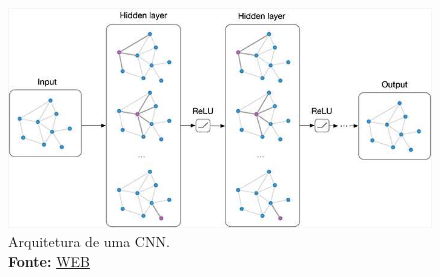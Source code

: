 \begin{figure}[h]
    \centering
    \includegraphics[width=0.5\linewidth]{image.png}
    \caption{Arquitetura de uma CNN. \\ \textbf{Fonte:} \href{https://vitorborbarodrigues.medium.com/conhecendo-a-vis%C3%A3o-do-computador-redes-neurais-convolucionais-e1c2b14bf426}{WEB}}
    \label{fig:tdd}
\end{figure}